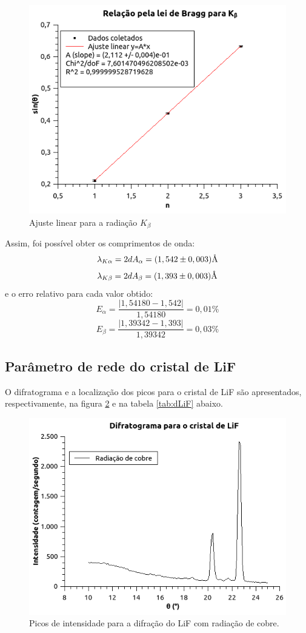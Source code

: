 \documentclass[article,12pt,openright,oneside,a4paper,brazil]{abntex2}
\begin{document}
\begin{figure}[H]
    \centering
    \includegraphics[scale=0.8]{Figuras/Kb.png}
    \caption{Ajuste linear para a radiação $K_\beta$}
    \label{fig:kbr-kb}
\end{figure}

Assim, foi possível obter os comprimentos de onda:
$$\lambda_{K\alpha}=2dA_\alpha=(1,542\pm0,003)\text{\normalfont\AA}$$
$$\lambda_{K\beta}=2dA_\beta=(1,393\pm0,003)\text{\normalfont\AA}$$
e o erro relativo para cada valor obtido:
$$E_\alpha=\frac{|1,54180-1,542|}{1,54180}=0,01\%$$
$$E_\beta=\frac{|1,39342-1,393|}{1,39342}=0,03\%$$

\subsection{Parâmetro de rede do cristal de LiF}

O difratograma e a localização dos picos para o cristal de LiF são apresentados, respectivamente, na figura \ref{fig:LiF} e na tabela \ref{tab:dLiF} abaixo.

\begin{figure}[H]
    \centering
    \includegraphics[scale=0.8]{Figuras/LiF.png}
    \caption{Picos de intensidade para a difração do LiF com radiação de cobre.}
    \label{fig:LiF}
\end{figure}
\end{document}
